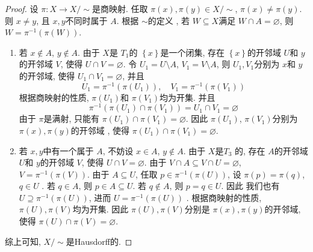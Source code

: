 \documentclass[../main.tex]{subfiles}
\begin{document}
\begin{proof}
    设 \(   \pi : X\to X/ \sim   \)是商映射. 任取 \(   \pi \left( x \right),  \pi \left( y \right) \in X / \sim     \), \(   \pi \left( x \right)\neq  \pi \left( y \right)    \). 则 \(  x\neq y  \), 且 \(  x,y  \)不同时属于 \(  A  \). 根据 \(  \sim   \)的定义 , 若 \( W\subseteq X  \)满足 \( W\cap A = \varnothing \), 则 \(  W=  \pi ^{-1} \left(  \pi \left( W \right)  \right)   \).   
    
    \begin{enumerate}
        \item 若 \(  x\not \in A  \), \(  y \not \in A  \).  由于 \(  X  \)是 \(  T_1  \)的 \(  \left\{ x \right\}  \)是一个闭集, 存在 \(  \left\{ x \right\}  \)的开邻域 \(  U  \)和 \(  y  \)的开邻域 \(  V  \), 使得 \(  U\cap V= \varnothing  \).        令 \(  U_1= U\setminus A  \), \(  V_1= V\setminus A  \), 则 \(  U_1,V_1  \)分别为 \(  x  \)和 \(  y  \)的开邻域, 使得 \(  U_1\cap V_1= \varnothing  \), 并且 \[
        U_1=  \pi ^{-1} \left(  \pi \left( U_1 \right)  \right) ,\quad V_1=  \pi ^{-1} \left(  \pi \left( V_1 \right)  \right) 
        \]      根据商映射的性质,  \(   \pi \left( U_1 \right)   \)和 \(   \pi \left( V_1 \right)   \)均为开集. 并且 \[
         \pi ^{-1} \left(  \pi \left( U_1 \right)\cap  \pi \left( V_1 \right)   \right)=  U_1\cap V_1= \varnothing 
        \]  由于 \(   \pi   \)是满射, 只能有 \(   \pi \left( U_1 \right)\cap  \pi \left( V_1 \right)= \varnothing    \). 因此 \(   \pi \left( U_1 \right)   \), \(   \pi \left( V_1 \right)   \)分别为 \(   \pi \left( x \right),  \pi \left( y \right)    \)的开邻域 , 使得 \(   \pi \left( U_1 \right)\cap  \pi \left( V_1 \right)= \varnothing    \).      
        \item 若 \(  x,y  \)中有一个属于 \(  A  \), 不妨设 \(  x \in A  \), \(  y\not \in A  \). 由于 \(  X  \)是\(  T_3  \) 的, 存在 \(  A  \)的开邻域 \(  U  \)和 \(  y  \)的开邻域 \(  V  \), 使得 \(  U\cap V=  \varnothing  \).    由于 \(  V\cap A  \subseteq V\cap U= \varnothing\), \(  V=   \pi ^{-1} \left(  \pi \left( V \right)  \right)   \).   由于 \(  A\subseteq U  \), 任取 \(  p \in  \pi ^{-1} \left(  \pi \left( U \right)  \right)   \), 设 \(   \pi \left( p \right)=  \pi \left( q \right)    \), \(  q \in U  \) . 若 \(  q \in A  \), 则 \(  p \in A\subseteq U  \). 若 \(  q\not \in A  \), 则 \(  p =  q \in U  \).  因此      我们也有 \( U\supseteq   \pi ^{-1} \left(  \pi \left( U \right)  \right)   \), 进而 \(  U=  \pi ^{-1} \left(  \pi \left( U \right)  \right)   \) . 根据商映射的性质,  \(   \pi \left( U \right),  \pi \left( V \right)    \)均为开集. 因此 \(   \pi \left( U \right),  \pi \left( V \right)    \)分别是 \(   \pi \left( x \right),  \pi \left( y \right)    \)的开邻域, 使得    \(   \pi \left( U \right)\cap  \pi \left( V \right)= \varnothing    \). 
    \end{enumerate}
    综上可知,  \(  X / \sim   \)是Hausdorff的. 
\end{proof}
\end{document}
